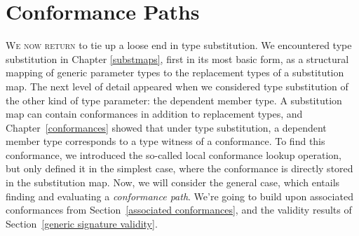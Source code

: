 \documentclass[../generics]{subfiles}
\begin{document}
\newcommand{\NormalConformance}[4]{
\begin{tabular}{|lcl|}
\hline
\multicolumn{3}{|l|}{\texttt{#1:\ #2}}\\
\hline
\rule{0pt}{3ex}\textbf{Associated type}&&\textbf{Type witness}\\
#3\\[\medskipamount]
\textbf{Conformance requirement}&&\textbf{Conformance}\\
#4\\[\medskipamount]
\hline
\end{tabular}
}
\newcommand{\AssocTypeDef}[2]{$\AssocType{#1}$&$\mapsto$&\texttt{#2}}
\newcommand{\AssocConfDef}[3]{$\AssocConf{#1}{#3}$&$\mapsto$&\ConfReq{#2}{#3}}

\chapter{Conformance Paths}\label{conformance paths}

\lettrine{W}{e now return} to tie up a loose end in type substitution. We encountered type substitution in Chapter \ref{substmaps}, first in its most basic form, as a structural mapping of generic parameter types to the replacement types of a substitution map. The next level of detail appeared when we considered type substitution of the other kind of type parameter: the dependent member type. A substitution map can contain conformances in addition to replacement types, and Chapter~\ref{conformances} showed that under type substitution, a dependent member type corresponds to a type witness of a conformance. To find this conformance, we introduced the so-called local conformance lookup operation, but only defined it in the simplest case, where the conformance is directly stored in the substitution map. Now, we will consider the general case, which entails finding and evaluating a \emph{conformance path}. We're going to build upon associated conformances from Section~\ref{associated conformances}, and the validity results of Section~\ref{generic signature validity}.
\end{document}
